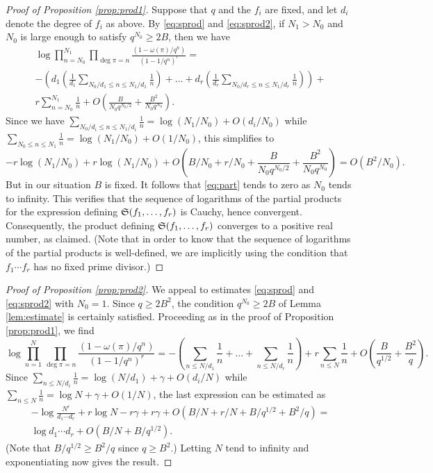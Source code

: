 \documentclass[a4paper]{compositio}
\begin{document}
\begin{proof}[Proof of Proposition \ref{prop:prod1}] Suppose that
$q$ and the $f_i$ are fixed, and let $d_i$ denote the degree of
$f_i$ as above. By \eqref{eq:sprod} and \eqref{eq:sprod2}, if $N_1
> N_0$ and $N_0$ is large enough to satisfy $q^{N_0} \geq 2B$, then
we have
\begin{multline}\label{eq:part} \log \prod_{n=N_0}^{N_1}
\prod_{\deg\pi=n}\frac{\left(1-\omega(\pi)/q^n\right)}{(1-1/q^n)^r}
=\\ -\left(d_1 \left(\frac{1}{d_1} \sum_{N_0/d_1 \leq n \leq
N_1/d_1}\frac{1}{n}\right) +\dots + d_r \left(\frac{1}{d_r}
\sum_{N_0/d_r \leq n \leq N_1/d_r}\frac{1}{n}\right)\right) +\\ r
\sum_{n=N_0}^{N_1} \frac{1}{n} + O\left(\frac{B}{N_0 q^{N_0/2}} +
\frac{B^2}{N_0 q^{N_0}}\right).
\end{multline}
Since we have $\sum_{N_0/d_i \leq n \leq N_1/d_i}\frac{1}{n} =
\log{(N_1/N_0)} + O(d_i/N_0)$ while $\sum_{N_0 \leq n \leq
N_1}\frac{1}{n} = \log{(N_1/N_0)} + O(1/N_0)$, this simplifies to
\[ -r \log{(N_1/N_0)} + r \log{(N_1/N_0)} + O\left(B/N_0 + r/N_0 +
\frac{B}{N_0 q^{N_0/2}} + \frac{B^2}{N_0 q^{N_0}}\right) =
O(B^2/N_0).\] But in our situation $B$ is fixed. It follows that
\eqref{eq:part} tends to zero as $N_0$ tends to infinity. This
verifies that the sequence of logarithms of the partial products for
the expression defining $\mathfrak{S}(f_1, \dots,f_r)$ is Cauchy, hence
convergent. Consequently, the product defining $\mathfrak{S}(f_1, \dots,
f_r)$ converges to a positive real number, as claimed. (Note that in
order to know that the sequence of logarithms of the partial
products is well-defined, we are implicitly using the condition that
$f_1\cdots f_r$ has no fixed prime divisor.)
\end{proof}

\begin{proof}[Proof of Proposition \ref{prop:prod2}] We appeal to
estimates \eqref{eq:sprod} and \eqref{eq:sprod2} with $N_0 = 1$.
Since $q\geq 2B^2$, the condition $q^{N_0} \geq 2B$ of Lemma
\ref{lem:estimate} is certainly satisfied. Proceeding as in the
proof of Proposition \ref{prop:prod1}, we find \[ \log
\prod_{n=1}^{N}\prod_{\deg{\pi}=n}\frac{\left(1-\omega(\pi)/q^n\right)}{(1-1/q^n)^r}
= - \left(\sum_{n \leq N/d_1}\frac{1}{n} + \dots + \sum_{n  \leq
N/d_r}\frac{1}{n}\right) + r \sum_{n \leq N} \frac{1}{n} +
O\left(\frac{B}{q^{1/2}} + \frac{B^2}{q}\right). \]Since $\sum_{n
\leq N/d_i} \frac{1}{n} = \log{(N/d_1)} + \gamma + O(d_i/N)$ while
$\sum_{n \leq N}\frac{1}{n} = \log{N} + \gamma + O(1/N)$, the last
expression can be estimated as
\begin{multline*}
 -\log{\frac{N^r}{d_1 \cdots d_r}} + r \log{N} -r\gamma + r\gamma + O(B/N + r/N + B/q^{1/2} + B^2/q) =\\ \log{d_1\cdots
 d_r} + O(B/N + B/q^{1/2}).
\end{multline*}
(Note that $B/q^{1/2} \geq B^2/q$ since $q \geq B^2$.) Letting $N$
tend to infinity and exponentiating now gives the result.
\end{proof}
\end{document}
